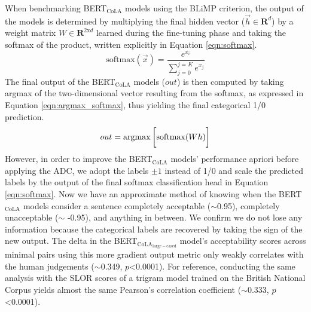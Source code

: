 When benchmarking BERT$_\mathrm{CoLA}$ models using the BLiMP criterion, the output of the models is determined by multiplying the final hidden vector ($\vec{h}\in \mathbf{R}^d$) by a weight matrix $W\in \mathbf{R}^{2\mathrm{x}d}$ learned during the fine-tuning phase and taking the softmax of the product, written explicitly in Equation \ref{eqn:softmax}.
\begin{equation}
    \mathrm{softmax}(\vec{x}) = \frac{e^{x_i}}{\sum_{j=0}^{j=K}e^{x_j}}
    \label{eqn:softmax}
\end{equation}
The final output of the BERT$_\mathrm{CoLA}$ models ($out$) is then computed by taking argmax of the two-dimensional vector resulting from the softmax, as expressed in Equation \ref{eqn:argmax_softmax}, thus yielding the final categorical 1/0 prediction.
\begin{equation}
    out = \operatorname*{argmax}\bigg[\mathrm{softmax}(Wh)\bigg]
    \label{eqn:argmax_softmax}
\end{equation}
However, in order to improve the BERT$_\mathrm{CoLA}$ models' performance apriori before applying the ADC, we adopt the labels $\pm1$ instead of 1/0 and scale the predicted labels by the output of the final softmax classification head in Equation \ref{eqn:softmax}.  Now we have an approximate method of knowing when the BERT$_\mathrm{CoLA}$ models consider a sentence completely acceptable ($\sim$0.95), completely unacceptable ($\sim$ -0.95), and anything in between.  We confirm we do not lose any information because the categorical labels are recovered by taking the sign of the new output.  The delta in the BERT$_\mathrm{CoLA_{large-cased}}$ model's acceptability scores across minimal pairs using this more gradient output metric only weakly correlates with the human judgements ($\sim$0.349, $p$<0.0001).  For reference, conducting the same analysis with the SLOR scores of a trigram model trained on the British National Corpus \citep{sprouse2018colorless} yields almost the same Pearson's correlation coefficient ($\sim$0.333, $p$<0.0001).


